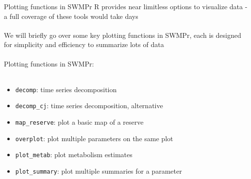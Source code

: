 \documentclass[xcolor=dvipsnames,serif]{beamer}\usepackage[]{graphicx}\usepackage[]{color}
\begin{document}
\begin{frame}[fragile]{Plotting functions in SWMPr}
R provides near limitless options to visualize data - a full coverage of these tools would take days \\~\\
We will briefly go over some key plotting functions in SWMPr, each is designed for simplicity and efficiency to summarize lots of data \\~\\
Plotting functions in SWMPr: \\~\\
\begin{itemize}
\item \texttt{decomp}: time series decomposition
\item \texttt{decomp\_cj}: time series decomposition, alternative
\item \texttt{map\_reserve}: plot a basic map of a reserve
\item \texttt{overplot}: plot multiple parameters on the same plot
\item \texttt{plot\_metab}: plot metabolism estimates
\item \texttt{plot\_summary}: plot multiple summaries for a parameter
\end{itemize}
\end{frame}
\end{document}
